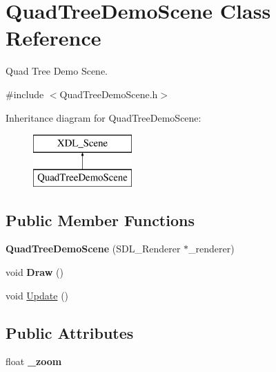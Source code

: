 \hypertarget{class_quad_tree_demo_scene}{\section{Quad\-Tree\-Demo\-Scene Class Reference}
\label{class_quad_tree_demo_scene}
}


Quad Tree Demo Scene.  




{\ttfamily \#include $<$Quad\-Tree\-Demo\-Scene.\-h$>$}

Inheritance diagram for Quad\-Tree\-Demo\-Scene\-:\begin{figure}[H]
\begin{center}
\leavevmode
\includegraphics[height=2.000000cm]{class_quad_tree_demo_scene}
\end{center}
\end{figure}
\subsection*{Public Member Functions}
\begin{DoxyCompactItemize}
\item 
\hypertarget{class_quad_tree_demo_scene_a655ff19b716b5bc336a1f004535e04e1}{{\bfseries Quad\-Tree\-Demo\-Scene} (S\-D\-L\-\_\-\-Renderer $\ast$\-\_\-renderer)}\label{class_quad_tree_demo_scene_a655ff19b716b5bc336a1f004535e04e1}

\item 
\hypertarget{class_quad_tree_demo_scene_abad22e646532dee71a174ac3acda4f12}{void {\bfseries Draw} ()}\label{class_quad_tree_demo_scene_abad22e646532dee71a174ac3acda4f12}

\item 
void \hyperlink{class_quad_tree_demo_scene_a80d832cec597edf526082b9e1585edbb}{Update} ()
\end{DoxyCompactItemize}
\subsection*{Public Attributes}
\begin{DoxyCompactItemize}
\item 
\hypertarget{class_quad_tree_demo_scene_a1f4a31ff3e8ee9b6ed66d15004056fa5}{float {\bfseries \-\_\-zoom}}\label{class_quad_tree_demo_scene_a1f4a31ff3e8ee9b6ed66d15004056fa5}

\end{DoxyCompactItemize}
